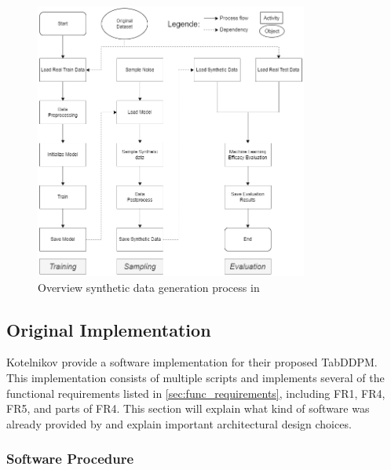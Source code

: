 \begin{figure}[h]
	\centering
	\includegraphics[width=0.8\textwidth]{images/Overall_original.png}
	\caption[Overview Original Software]{Overview synthetic data generation process in \cite{akim2023TabDDPMModellingTabular}}
	\label{fig:overall_original}
\end{figure}


\subsection{Original Implementation}
\label{ch:conceptualDesign-existingCodeBase-originalImplementation}

Kotelnikov \etal provide a software implementation \cite{akim2023TabDDPMModellingTabular} for their proposed TabDDPM.
This implementation consists of multiple scripts and implements several of the functional requirements listed in \autoref{sec:func_requirements}, including FR1, FR4, FR5, and parts of FR4.
This section will explain what kind of software was already provided by \cite{kotelnikov2022TabDDPMModellingTabular} and explain important architectural design choices.

\subsubsection[]{Software Procedure}
\label{ch:Software_Procedure}

